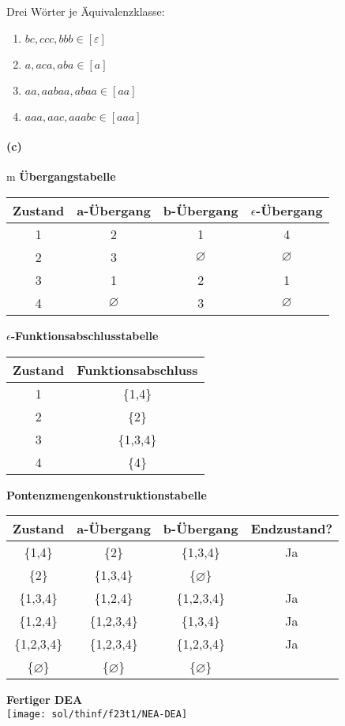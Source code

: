 	Drei Wörter je Äquivalenzklasse:
	\begin{enumerate}
		\item $bc, ccc, bbb \in [\varepsilon]$
		\item $a, aca, aba \in [a]$
		\item $aa, aabaa, abaa \in [aa]$
		\item $aaa, aac, aaabc \in [aaa]$
	\end{enumerate}
	\vspace{0.3cm}
	
\paragraph{(c)}m 
	\textbf{Übergangstabelle}
	
	\begin{tabular}{|c|c|c|c|}
		\hline
		\textbf{Zustand}  & \textbf{a-Übergang} & \textbf{b-Übergang} & \textbf{$\epsilon$-Übergang} \\
		\hline
		1                 & 2                   & 1                   & 4 \\
		\hline
		2                 & 3                   & $\varnothing$       & $\varnothing$ \\
		\hline
		3                 & 1                   & 2                   & 1 \\
		\hline
		4                 & $\varnothing$       & 3                   & $\varnothing$ \\
		\hline
	\end{tabular}
	
	
	\textbf{$\epsilon$-Funktionsabschlusstabelle}
		
	\begin{tabular}{|c|c|}
		\hline
		\textbf{Zustand}  & \textbf{Funktionsabschluss} \\
		\hline
		1                 & \{1,4\} \\
		\hline
		2                 & \{2\} \\
		\hline
		3                 & \{1,3,4\}  \\
		\hline
		4                 & \{4\} \\
		\hline
	\end{tabular}
	
	\textbf{Pontenzmengenkonstruktionstabelle}
	
	\begin{tabular}{|c|c|c|c|}
		\hline
		\textbf{Zustand} & \textbf{a-Übergang} & \textbf{b-Übergang} & \textbf{Endzustand?} \\
		\hline
		\{1,4\}     & \{2\}       & \{1,3,4\}         & Ja \\
		\hline
		\{2\}       & \{1,3,4\}   & \{$\varnothing$\} &    \\
		\hline
		\{1,3,4\}   & \{1,2,4\}   & \{1,2,3,4\}       & Ja \\
		\hline
		\{1,2,4\}   & \{1,2,3,4\} & \{1,3,4\}         & Ja \\
		\hline
		\{1,2,3,4\} & \{1,2,3,4\} & \{1,2,3,4\}       & Ja \\
		\hline
		\{$\varnothing$\}       & \{$\varnothing$\}   & \{$\varnothing$\} &    \\
		\hline
	\end{tabular}	
	
	\textbf{Fertiger DEA} \\
	
	\texttt{[image: sol/thinf/f23t1/NEA-DEA]}
	


\newpage
